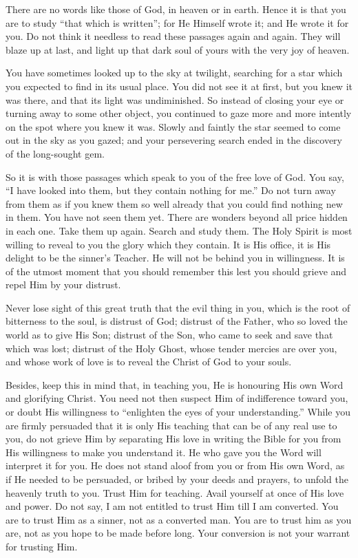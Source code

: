 \documentclass[
]{book}
\begin{document}
There are no words like those of God, in heaven or in earth. Hence it is that you are to study ``that which is written''; for He Himself wrote it; and He wrote it for you. Do not think it needless to read these passages again and again. They will blaze up at last, and light up that dark soul of yours with the very joy of heaven.

You have sometimes looked up to the sky at twilight, searching for a star which you expected to find in its usual place. You did not see it at first, but you knew it was there, and that its light was undiminished. So instead of closing your eye or turning away to some other object, you continued to gaze more and more intently on the spot where you knew it was. Slowly and faintly the star seemed to come out in the sky as you gazed; and your persevering search ended in the discovery of the long-sought gem.

So it is with those passages which speak to you of the free love of God. You say, ``I have looked into them, but they contain nothing for me.'' Do not turn away from them as if you knew them so well already that you could find nothing new in them. You have not seen them yet. There are wonders beyond all price hidden in each one. Take them up again. Search and study them. The Holy Spirit is most willing to reveal to you the glory which they contain. It is His office, it is His delight to be the sinner's Teacher. He will not be behind you in willingness. It is of the utmost moment that you should remember this lest you should grieve and repel Him by your distrust.

Never lose sight of this great truth that the evil thing in you, which is the root of bitterness to the soul, is distrust of God; distrust of the Father, who so loved the world as to give His Son; distrust of the Son, who came to seek and save that which was lost; distrust of the Holy Ghost, whose tender mercies are over you, and whose work of love is to reveal the Christ of God to your souls.

Besides, keep this in mind that, in teaching you, He is honouring His own Word and glorifying Christ. You need not then suspect Him of indifference toward you, or doubt His willingness to ``enlighten the eyes of your understanding.'' While you are firmly persuaded that it is only His teaching that can be of any real use to you, do not grieve Him by separating His love in writing the Bible for you from His willingness to make you understand it. He who gave you the Word will interpret it for you. He does not stand aloof from you or from His own Word, as if He needed to be persuaded, or bribed by your deeds and prayers, to unfold the heavenly truth to you. Trust Him for teaching. Avail yourself at once of His love and power. Do not say, I am not entitled to trust Him till I am converted. You are to trust Him as a sinner, not as a converted man. You are to trust him as you are, not as you hope to be made before long. Your conversion is not your warrant for trusting Him.
\end{document}
